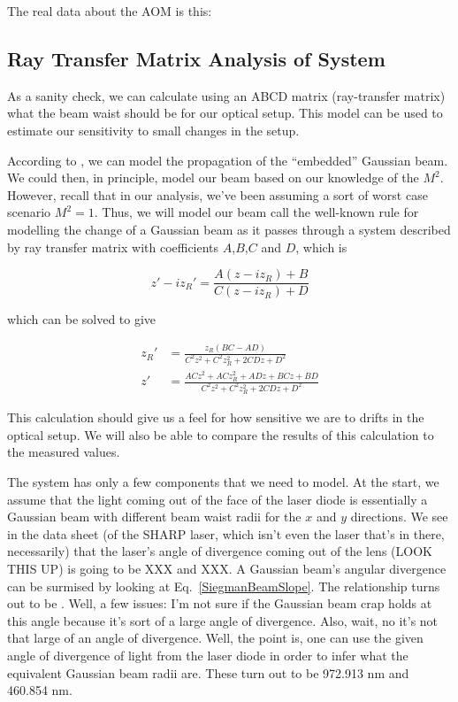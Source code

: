 The real data about the AOM is this: 


\subsection{Ray Transfer Matrix Analysis of System}
As a sanity check, we can calculate using an ABCD matrix (ray-transfer matrix) what the beam waist should be for our optical setup. This model can be used to estimate our sensitivity to small changes in the setup. 


According to \cite{SiegmanBeamQuality}, we can model the propagation of the ``embedded'' Gaussian beam. We could then, in principle, model our beam based on our knowledge of the $M^2$. However, recall that in our analysis, we've been assuming a sort of worst case scenario $M^2=1$. Thus, we will model our beam call the well-known rule for modelling the change of a Gaussian beam as it passes through a system described by ray transfer matrix with coefficients $A$,$B$,$C$ and $D$, which is 

\begin{equation}
z'-iz_R'=\frac{A(z-iz_R)+B}{C(z-iz_R)+D}
\end{equation}
\cite{BYUOpticsBook}

which can be solved to give 

\begin{align}
z_R' &= \frac{ z_R (BC-AD)}{C^2z^2+C^2z_R^2+2 C D z + D^2} \\
z' &=\frac{AC z^2+ACz_R^2+ADz+BCz+BD}{C^2z^2+C^2z_R^2+2 C D z + D^2}
\end{align}

This calculation should give us a feel for how sensitive we are to drifts in the optical setup. We will also be able to compare the results of this calculation to the measured values. 

The system has only a few components that we need to model. At the start, we assume that the light coming out of the face of the laser diode is essentially a Gaussian beam with different beam waist radii for the $x$ and $y$ directions. We see in the data sheet (of the SHARP laser, which isn't even the laser that's in there, necessarily) that the laser's angle of divergence coming out of the lens (LOOK THIS UP) is going to be XXX and XXX. A Gaussian beam's angular divergence can be surmised by looking at Eq.\ \ref{SiegmanBeamSlope}. The relationship turns out to be \cite{MellesGriotGaussian}. Well, a few issues: I'm not sure if the Gaussian beam crap holds at this angle because it's sort of a large angle of divergence. Also, wait, no it's not that large of an angle of divergence. Well, the point is, one can use the given angle of divergence of light from the laser diode in order to infer what the equivalent Gaussian beam radii are. These turn out to be 972.913 nm and 460.854 nm. 

